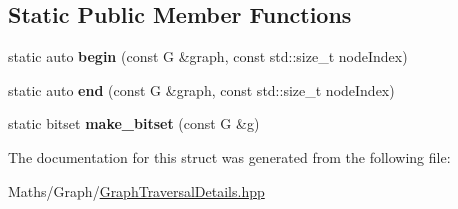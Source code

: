 \subsection*{Static Public Member Functions}
\begin{DoxyCompactItemize}
\item 
\mbox{\label{structsequoia_1_1sequoia_1_1maths_1_1graph__impl_1_1traversal__traits_a708752713dd163ee05a93a5ce85b7c5e}} 
static auto {\bfseries begin} (const G \&graph, const std\+::size\+\_\+t node\+Index)
\item 
\mbox{\label{structsequoia_1_1sequoia_1_1maths_1_1graph__impl_1_1traversal__traits_ab899c7e499a0569865cb34df6f903b16}} 
static auto {\bfseries end} (const G \&graph, const std\+::size\+\_\+t node\+Index)
\item 
\mbox{\label{structsequoia_1_1sequoia_1_1maths_1_1graph__impl_1_1traversal__traits_a90fe067a6a4543393b2e479690ba5865}} 
static bitset {\bfseries make\+\_\+bitset} (const G \&g)
\end{DoxyCompactItemize}


The documentation for this struct was generated from the following file\+:\begin{DoxyCompactItemize}
\item 
Maths/\+Graph/\mbox{\hyperlink{_graph_traversal_details_8hpp}{Graph\+Traversal\+Details.\+hpp}}\end{DoxyCompactItemize}
